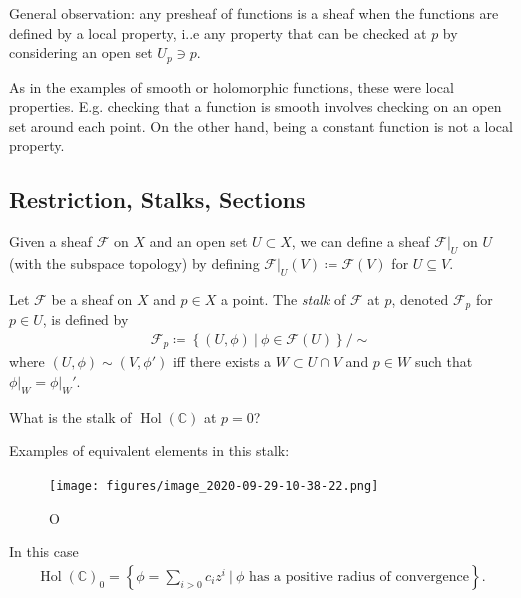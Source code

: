 \begin{remark}

General observation: any presheaf of functions is a sheaf when the
functions are defined by a local property, i..e any property that can be
checked at \(p\) by considering an open set \(U_p \ni p\).

As in the examples of smooth or holomorphic functions, these were local
properties. E.g. checking that a function is smooth involves checking on
an open set around each point. On the other hand, being a constant
function is not a local property.

\end{remark}

\hypertarget{restriction-stalks-sections}{%
\subsection{Restriction, Stalks,
Sections}\label{restriction-stalks-sections}}

\begin{definition}

Given a sheaf \(\mathcal{F}\) on \(X\) and an open set \(U\subset X\),
we can define a sheaf \({ \left.{{\mathcal{F}}} \right|_{{U}} }\) on
\(U\) (with the subspace topology) by defining
\({ \left.{{\mathcal{F}}} \right|_{{U}} }(V) \coloneqq\mathcal{F}(V)\)
for \(U\subseteq V\).

\end{definition}

\begin{definition}[Stalks]

Let \(\mathcal{F}\) be a sheaf on \(X\) and \(p\in X\) a point. The
\emph{stalk} of \(\mathcal{F}\) at \(p\), denoted \(\mathcal{F}_p\) for
\(p\in U\), is defined by
\begin{align*}  
\mathcal{F}_p \coloneqq\left\{{(U, \phi) {~\mathrel{\Big|}~}\phi \in \mathcal{F}(U) }\right\} / \sim
\end{align*}
where \((U, \phi) \sim (V, \phi')\) iff there exists a
\(W\subset U\cap V\) and \(p\in W\) such that
\({ \left.{{\phi}} \right|_{{W}} } = { \left.{{\phi}} \right|_{{W}} }'\).

\end{definition}

\begin{example}

What is the stalk of \(\operatorname{Hol}({\mathbb{C}})\) at \(p=0\)?

Examples of equivalent elements in this stalk:

\begin{figure}
\centering
\texttt{[image: figures/image\_2020-09-29-10-38-22.png]}
\caption{O}
\end{figure}

In this case
\begin{align*}  
\operatorname{Hol}({\mathbb{C}})_0 = \left\{{\phi = \sum_{i>0}c_i z^i {~\mathrel{\Big|}~}\phi \text{ has a positive radius of convergence}}\right\}
.\end{align*}

\end{example}

